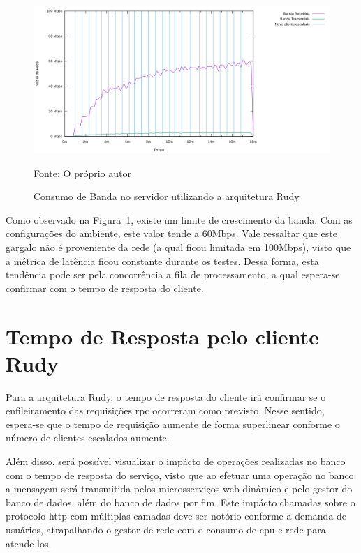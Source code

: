 \begin{figure}[htb!]
    \caption{Consumo de Banda no servidor utilizando a arquitetura Rudy}
    \label{fig:rudy_t4_io}
    \includegraphics[width=\textwidth]{metricas_rudy_t4/io.png}
    \centering
    
    Fonte: O próprio autor
\end{figure}

Como observado na Figura~\ref{fig:rudy_t4_io}, existe um limite de crescimento da banda.
%
Com as configurações do ambiente, este valor tende a 60Mbps.
%
Vale ressaltar que este gargalo não é proveniente da rede (a qual ficou limitada em 100Mbps), visto que a métrica de latência ficou constante durante os testes.
%
Dessa forma, esta tendência pode ser pela concorrência a fila de processamento, a qual espera-se confirmar com o tempo de resposta do cliente.

\section{Tempo de Resposta pelo cliente Rudy}

Para a arquitetura Rudy, o tempo de resposta do cliente irá confirmar se o enfileiramento das requisições \ac{rpc} ocorreram como previsto.
%
Nesse sentido, espera-se que o tempo de requisição aumente de forma superlinear conforme o número de clientes escalados aumente.


Além disso, será possível visualizar o impácto de operações realizadas no banco com o tempo de resposta do serviço, visto que ao efetuar uma operação no banco a mensagem será transmitida pelos microsserviços web dinâmico e pelo gestor do banco de dados, além do banco de dados por fim.
%
Este impácto chamadas sobre o protocolo \ac{http} com múltiplas camadas deve ser notório conforme a demanda de usuários, atrapalhando o gestor de rede com o consumo de \ac{cpu} e rede para atende-los.

